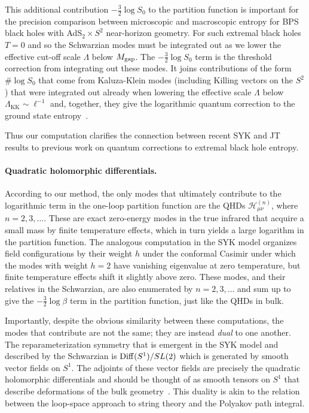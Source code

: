\documentclass[12pt]{article}
\begin{document}
This additional contribution $-\frac{3}{2}\log S_0$ to the partition function is important for the precision comparison between microscopic and macroscopic entropy for BPS black holes with AdS$_2\times S^2$ near-horizon geometry. For such extremal black holes $T = 0$ and so the Schwarzian modes must be integrated out as we lower the effective cut-off scale $\Lambda$ below $M_{\rm gap}$.  The $-\frac{3}{2}\log S_0$ term is the threshold correction from integrating out these modes. It joins contributions of the form $\#\log S_0$ that come from Kaluza-Klein modes (including Killing vectors on the $S^2$) that were integrated out already when lowering the effective scale $\Lambda$ below $\Lambda_\text{KK} \sim \ell^{-1}$ and, together, they give the logarithmic quantum correction to the ground state entropy~\cite{Sen:2014aja,Keeler:2014bra}. 

Thus our computation clarifies the connection between recent SYK and JT results to previous work on quantum corrections to extremal black hole entropy. 

\paragraph{Quadratic holomorphic differentials.}  According to our method, the only modes that ultimately contribute to the logarithmic term in the one-loop partition function are the QHDs $\mathcal{H}^{(n)}_{\mu\nu}$, where $n = 2,3,\ldots$.  These are exact zero-energy modes in the true infrared that acquire a small mass by finite temperature effects, which in turn yields a large logarithm in the partition function. The analogous computation in the SYK model organizes field configurations by their weight $h$ under the conformal Casimir under which the modes with weight $h=2$ have vanishing eigenvalue at zero temperature, but finite temperature effects shift it slightly above zero. These modes, and their relatives in the Schwarzian, are also enumerated by $n= 2,3,\ldots$ and sum up to give the $-\frac{3}{2}\log \beta$ term in the partition function, just like the QHDs in bulk.  

Importantly, despite the obvious similarity between these computations, the modes that contribute are not the same; they are instead \emph{dual} to one another. The reparameterization symmetry that is emergent in the SYK model and described by the Schwarzian is ${\rm Diff}(S^1)/SL(2)$ which is generated by smooth vector fields on $S^1$. The adjoints of these vector fields are precisely the quadratic holomorphic differentials and should be thought of as smooth tensors on $S^1$ that describe deformations of the bulk geometry~\cite{Witten:1987ty,Taylor:1992xt}. This duality is akin to the relation between the loop-space approach to string theory and the Polyakov path integral. 
\end{document}
